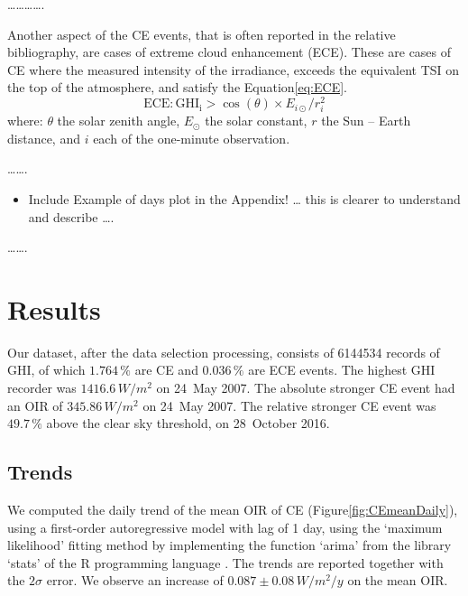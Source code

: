 \documentclass[preprint, 3p,
authoryear]{elsarticle} %
\providecommand{\tightlist}{%
  \setlength{\itemsep}{0pt}\setlength{\parskip}{0pt}}
\begin{document}
\ldots\ldots\ldots\ldots.

Another aspect of the CE events, that is often reported in the relative
bibliography, are cases of extreme cloud enhancement (ECE). These are
cases of CE where the measured intensity of the irradiance, exceeds the
equivalent TSI on the top of the atmosphere, and satisfy the
Equation\nobreakspace{}\ref{eq:ECE}. \begin{equation}
\text{ECE}: \text{GHI}_\text{i} > \cos(\theta) \times E_{i\odot} / r_{i}^2
\label{eq:ECE}
\end{equation} where: \(\theta\) the solar zenith angle, \(E_{\odot}\)
the solar constant, \(r\) the Sun -- Earth distance, and \(i\) each of
the one-minute observation.

\ldots\ldots.

\begin{itemize}
\tightlist
\item
  Include Example of days plot in the Appendix! \ldots{} this is clearer
  to understand and describe \ldots.
\end{itemize}

\ldots\ldots.

\hypertarget{results}{%
\section{Results}\label{results}}

Our dataset, after the data selection processing, consists of 6144534
records of GHI, of which \(1.764\,\%\) are CE and \(0.036\,\%\) are ECE
events. The highest GHI recorder was \(1416.6\,W/m^2\) on 24~May 2007.
The absolute stronger CE event had an OIR of \(345.86\,W/m^2\) on 24~May
2007. The relative stronger CE event was \(49.7\,\%\) above the clear
sky threshold, on 28~October 2016.

\hypertarget{trends}{%
\subsection{Trends}\label{trends}}

We computed the daily trend of the mean OIR of CE
(Figure\nobreakspace{}\ref{fig:CEmeanDaily}), using a first-order
autoregressive model with lag of 1 day, using the `maximum likelihood'
fitting method \citep{Gardner1980, Jones1980} by implementing the
function `arima' from the library `stats' of the R programming language
\citep{RCT2023}. The trends are reported together with the \(2\sigma\)
error. We observe an increase of \(0.087\pm 0.08\,W/m^2/y\) on the mean
OIR.
\end{document}
